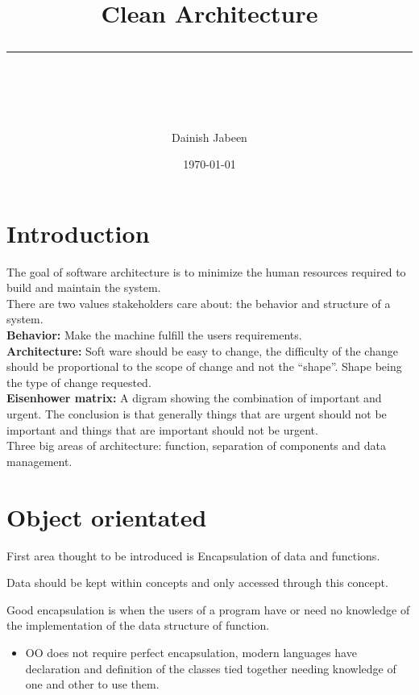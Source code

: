 \documentclass[11pt]{scrartcl} %
\title{	
	\normalfont\normalsize
	\vspace{20pt} %
	{\huge Clean Architecture}\\ %
	\vspace{12pt} %
	\rule{\linewidth}{2pt}\\ %
}
\author{\small Dainish Jabeen} %
\date{\normalsize\today} %
\begin{document}
\maketitle %

\tableofcontents

\pagebreak

\section{Introduction}

The goal of software architecture is to minimize the human resources
required to build and maintain the system.\\

There are two values stakeholders care about: the behavior and structure
of a system.\\

\textbf{Behavior:} Make the machine fulfill the users requirements.\\

\textbf{Architecture:} Soft ware should be easy to change, the
difficulty of the change should be proportional to the scope of change
and not the ``shape''. Shape being the type of change requested.\\

\textbf{Eisenhower matrix:} A digram showing the combination of
important and urgent. The conclusion is that generally things that are
urgent should not be important and things that are important should not
be urgent.\\

Three big areas of architecture: function, separation of components and
data management.

\section{Object orientated}

First area thought to be introduced is Encapsulation of data and
functions.

Data should be kept within concepts and only accessed through this
concept.

Good encapsulation is when the users of a program have or need no
knowledge of the implementation of the data structure of function.

\begin{itemize}
\item
  OO does not require perfect encapsulation, modern languages have
  declaration and definition of the classes tied together needing
  knowledge of one and other to use them.
\end{itemize}
\end{document}
